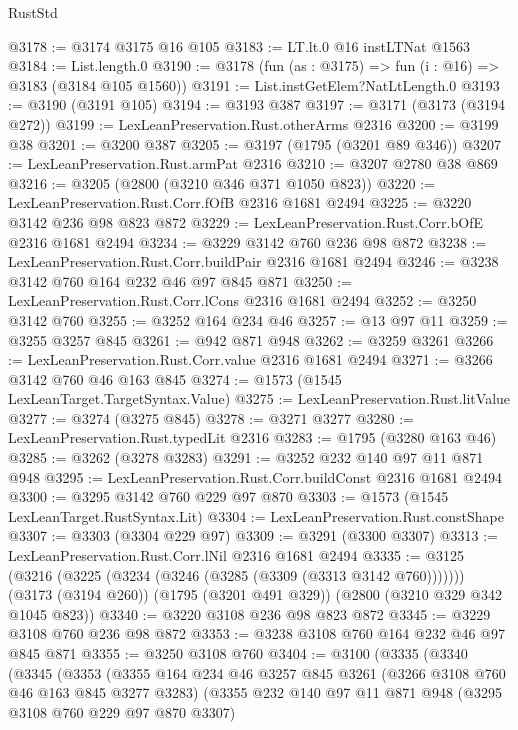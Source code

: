 \begin{lexlean}{RustStd}
\begin{coremodule}
@3178 := @3174 @3175 @16 @105
@3183 := LT.lt.{0} @16 instLTNat @1563
@3184 := List.length.{0}
@3190 := @3178 (fun (as : @3175) => fun (i : @16) => @3183 (@3184 @105 @1560))
@3191 := List.instGetElem?NatLtLength.{0}
@3193 := @3190 (@3191 @105)
@3194 := @3193 @387
@3197 := @3171 (@3173 (@3194 @272))
@3199 := LexLeanPreservation.Rust.otherArms @2316
@3200 := @3199 @38
@3201 := @3200 @387
@3205 := @3197 (@1795 (@3201 @89 @346))
@3207 := LexLeanPreservation.Rust.armPat @2316
@3210 := @3207 @2780 @38 @869
@3216 := @3205 (@2800 (@3210 @346 @371 @1050 @823))
@3220 := LexLeanPreservation.Rust.Corr.fOfB @2316 @1681 @2494
@3225 := @3220 @3142 @236 @98 @823 @872
@3229 := LexLeanPreservation.Rust.Corr.bOfE @2316 @1681 @2494
@3234 := @3229 @3142 @760 @236 @98 @872
@3238 := LexLeanPreservation.Rust.Corr.buildPair @2316 @1681 @2494
@3246 := @3238 @3142 @760 @164 @232 @46 @97 @845 @871
@3250 := LexLeanPreservation.Rust.Corr.lCons @2316 @1681 @2494
@3252 := @3250 @3142 @760
@3255 := @3252 @164 @234 @46
@3257 := @13 @97 @11
@3259 := @3255 @3257 @845
@3261 := @942 @871 @948
@3262 := @3259 @3261
@3266 := LexLeanPreservation.Rust.Corr.value @2316 @1681 @2494
@3271 := @3266 @3142 @760 @46 @163 @845
@3274 := @1573 (@1545 LexLeanTarget.TargetSyntax.Value)
@3275 := LexLeanPreservation.Rust.litValue
@3277 := @3274 (@3275 @845)
@3278 := @3271 @3277
@3280 := LexLeanPreservation.Rust.typedLit @2316
@3283 := @1795 (@3280 @163 @46)
@3285 := @3262 (@3278 @3283)
@3291 := @3252 @232 @140 @97 @11 @871 @948
@3295 := LexLeanPreservation.Rust.Corr.buildConst @2316 @1681 @2494
@3300 := @3295 @3142 @760 @229 @97 @870
@3303 := @1573 (@1545 LexLeanTarget.RustSyntax.Lit)
@3304 := LexLeanPreservation.Rust.constShape
@3307 := @3303 (@3304 @229 @97)
@3309 := @3291 (@3300 @3307)
@3313 := LexLeanPreservation.Rust.Corr.lNil @2316 @1681 @2494
@3335 := @3125
    (@3216 (@3225 (@3234 (@3246 (@3285 (@3309 (@3313 @3142 @760)))))))
    (@3173 (@3194 @260))
    (@1795 (@3201 @491 @329))
    (@2800 (@3210 @329 @342 @1045 @823))
@3340 := @3220 @3108 @236 @98 @823 @872
@3345 := @3229 @3108 @760 @236 @98 @872
@3353 := @3238 @3108 @760 @164 @232 @46 @97 @845 @871
@3355 := @3250 @3108 @760
@3404 := @3100
    (@3335
      (@3340
        (@3345
          (@3353
            (@3355
              @164
              @234
              @46
              @3257
              @845
              @3261
              (@3266 @3108 @760 @46 @163 @845 @3277 @3283)
              (@3355
                @232
                @140
                @97
                @11
                @871
                @948
                (@3295 @3108 @760 @229 @97 @870 @3307)

\end{coremodule}
\end{lexlean}
